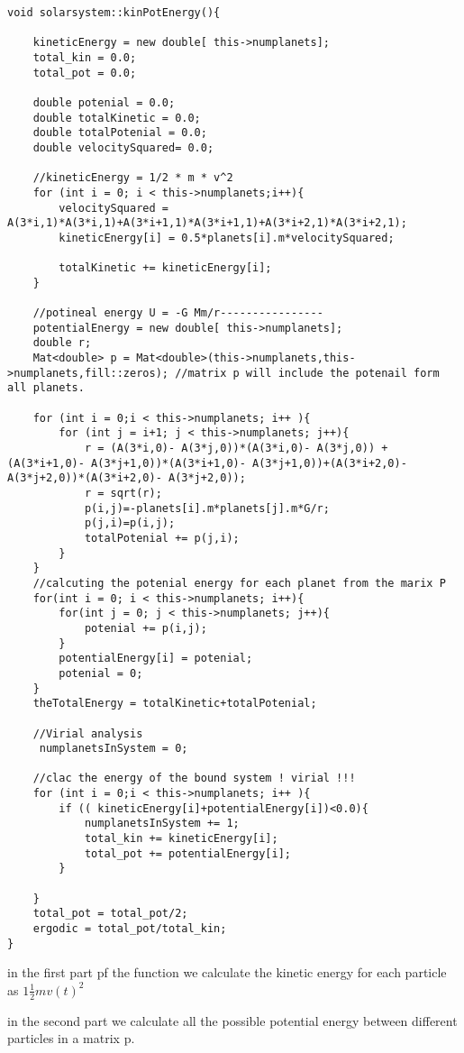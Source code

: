 \documentclass[10pt,a4paper]{article}
\begin{document}
\begin{lstlisting}
void solarsystem::kinPotEnergy(){

    kineticEnergy = new double[ this->numplanets];
    total_kin = 0.0;
    total_pot = 0.0;

    double potenial = 0.0;
    double totalKinetic = 0.0;
    double totalPotenial = 0.0;
    double velocitySquared= 0.0;

    //kineticEnergy = 1/2 * m * v^2
    for (int i = 0; i < this->numplanets;i++){
        velocitySquared = A(3*i,1)*A(3*i,1)+A(3*i+1,1)*A(3*i+1,1)+A(3*i+2,1)*A(3*i+2,1);
        kineticEnergy[i] = 0.5*planets[i].m*velocitySquared;

        totalKinetic += kineticEnergy[i];
    }

    //potineal energy U = -G Mm/r----------------
    potentialEnergy = new double[ this->numplanets];
    double r;
    Mat<double> p = Mat<double>(this->numplanets,this->numplanets,fill::zeros); //matrix p will include the potenail form all planets.

    for (int i = 0;i < this->numplanets; i++ ){
        for (int j = i+1; j < this->numplanets; j++){
            r = (A(3*i,0)- A(3*j,0))*(A(3*i,0)- A(3*j,0)) + (A(3*i+1,0)- A(3*j+1,0))*(A(3*i+1,0)- A(3*j+1,0))+(A(3*i+2,0)- A(3*j+2,0))*(A(3*i+2,0)- A(3*j+2,0));
            r = sqrt(r);
            p(i,j)=-planets[i].m*planets[j].m*G/r;
            p(j,i)=p(i,j);
            totalPotenial += p(j,i);
        }
    }
    //calcuting the potenial energy for each planet from the marix P
    for(int i = 0; i < this->numplanets; i++){
        for(int j = 0; j < this->numplanets; j++){
            potenial += p(i,j);
        }
        potentialEnergy[i] = potenial;
        potenial = 0;
    }
    theTotalEnergy = totalKinetic+totalPotenial;

    //Virial analysis
     numplanetsInSystem = 0;

    //clac the energy of the bound system ! virial !!!
    for (int i = 0;i < this->numplanets; i++ ){
        if (( kineticEnergy[i]+potentialEnergy[i])<0.0){
            numplanetsInSystem += 1;
            total_kin += kineticEnergy[i];
            total_pot += potentialEnergy[i];
        }

    }
    total_pot = total_pot/2;
    ergodic = total_pot/total_kin;
}
\end{lstlisting}
in the first part pf the function we calculate the kinetic energy for each particle as $1 \frac{1}{2}m v(t)^2 $

in the second part we calculate all the possible potential energy between different particles in a matrix p. 
 
\end{document}
